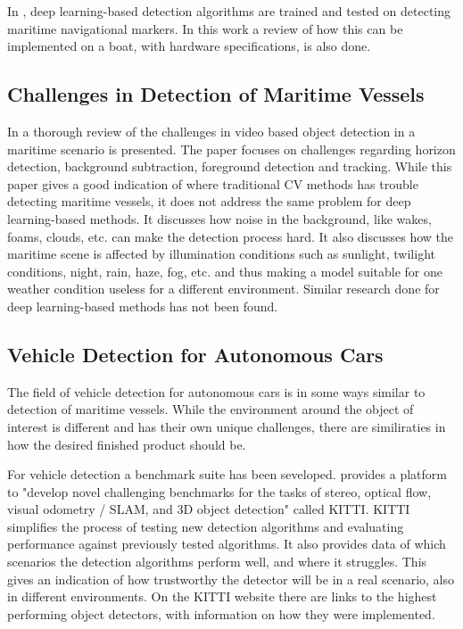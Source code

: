 \vspace{3mm}

In \citep{Goring2017}, deep learning-based detection algorithms are trained and tested on detecting maritime navigational markers. In this work a review of how this can be implemented on a boat, with hardware specifications, is also done. 


\subsection{Challenges in Detection of Maritime Vessels}

In \citep{Challenges2016} a thorough review of the challenges in video based object detection in a maritime scenario is presented. The paper focuses on challenges regarding horizon detection, background subtraction, foreground detection and tracking. While this paper gives a good indication of where traditional CV methods has trouble detecting maritime vessels, it does not address the same problem for deep learning-based methods. It discusses how noise in the background, like wakes, foams, clouds, etc. can make the detection process hard. It also discusses how the maritime scene is affected by illumination conditions such as sunlight, twilight conditions, night, rain, haze, fog, etc. and thus making a model suitable for one weather condition useless for a different environment. Similar research done for deep learning-based methods has not been found.




\subsection{Vehicle Detection for Autonomous Cars}

The field of vehicle detection for autonomous cars is in some ways similar to detection of maritime vessels. While the environment around the object of interest is different and has their own unique challenges, there are similiraties in how the desired finished product should be. 

\vspace{3mm}

For vehicle detection a benchmark suite has been seveloped. \citep{KITTI} provides a platform to "develop novel challenging benchmarks for the tasks of stereo, optical flow, visual odometry / SLAM, and 3D object detection" called KITTI. KITTI simplifies the process of testing new detection algorithms and evaluating performance against previously tested algorithms. It also provides data of which scenarios the detection algorithms perform well, and where it struggles. This gives an indication of how trustworthy the detector will be in a real scenario, also in different environments. On the KITTI website there are links to the highest performing object detectors, with information on how they were implemented.

